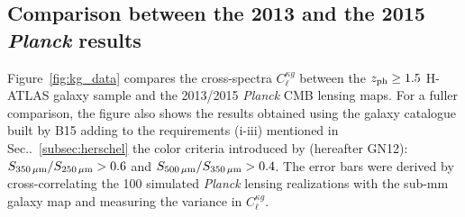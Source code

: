 \label{sec:resultsxc2}
\subsection{Comparison between the 2013 and the 2015 \emph{Planck} results}
Figure~\eqref{fig:kg_data} compares the cross-spectra $C_{\ell}^{\kappa g}$ between the $z_{\rm{ph}} \ge 1.5$ H-ATLAS galaxy sample and the 2013/2015 \emph{Planck} CMB lensing maps. For a fuller comparison, the figure also shows the results obtained using the galaxy catalogue built by B15 adding to the requirements (i-iii) mentioned in Sec..~\eqref{subsec:herschel} the color criteria introduced by \cite{Gonzalez-Nuevo2012} (hereafter GN12): $S_{350\,\mu\rm m}/S_{250\,\mu\rm m}>0.6$ and $S_{500\,\mu\rm m}/S_{350\,\mu\rm m}>0.4$. The error bars were derived by cross-correlating the 100 simulated \emph{Planck} lensing realizations with the sub-mm galaxy map and measuring the variance in $C_{\ell}^{\kappa g}$.


